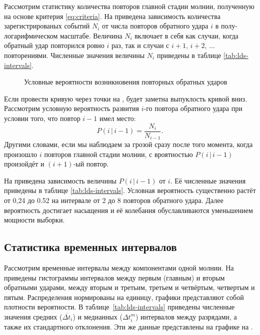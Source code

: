 Рассмотрим статистику количества повторов главной стадии молнии, полученную на основе критерия \eqref{eq:criteria}. На  приведена зависимость количества зарегистрированых событий $N_i$ от числа повторов обратного удара $i$ в полу-логарифмическом масштабе. Величина $N_i$ включает в себя как случаи, когда обратный удар повторился ровно $i$ раз, так и случаи с $i+1$, $i+2$, $...$ повторениями. Численные значения величины $N_i$ приведены в таблице \ref{tab:lds-intervals}.

\begin{figure}[h]
	\caption{Условные вероятности возникновения повторных обратных ударов}
	\label{fig:lds-probs}
\end{figure}

Если провести кривую через точки на , будет заметна выпуклость кривой вниз. Рассмотрим условную вероятность развития $i$-го повтора обратного удара при условии того, что повтор $i-1$ имел место:
\begin{equation}
	P(i\,|\,i-1) = \frac{N_i}{N_{i-1}}.
\end{equation}
Другими словами, если мы наблюдаем за грозой сразу после того момента, когда произошло $i$ повторов главной стадии молнии, с вроятностью $P(i\,|\,i-1)$ произойдёт и $(i+1)$-ый повтор.

На  приведена зависимость величины $P(i\,|\,i-1)$ от $i$. Её численные значения приведены в таблице \ref{tab:lds-intervals}. Условная вероятность существенно растёт от 0,24 до 0.52 на интервале от 2 до 8 повторов обратного удара. Далее вероятность достигает насыщения и её колебания обуславливаются уменьшением мощности выборки. 

\subsection{Статистика временных интервалов}

Рассмотрим временные интервалы между компонентами одной молнии. На  приведены гистограммы интервалов между первым (главным) и вторым обратными ударами, между вторым и третьим, третьем и четвёртым, четвертым и пятым. Распределения нормированы на единицу, графики представляют собой плотности вероятности. В таблице~\ref{tab:lds-intervals} приведены численные значения средних ($\overline {\Delta t_i}$) и медианных ($\Delta t_i^m$) интервалов между разрядами, а также их стандартного отклонения. Эти же данные представлены на графике на .

